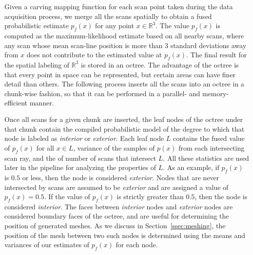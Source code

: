 \documentclass[12pt,onecolumn,oneside]{book}
\begin{document}
Given a carving mapping function for each scan point taken during the data acquisition process, we merge all the scans spatially to obtain a fused probabilistic estimate $p_f(x)$ for any point $x \in \mathbb{R}^3$.  The value $p_f(x)$ is computed as the maximum-likelihood estimate based on all nearby scans, where any scan whose mean scan-line position is more than $3$ standard deviations away from $x$ does not contribute to the estimated value at $p_f(x)$.  The final result for the spatial labeling of $\mathbb{R}^3$ is stored in an octree.  The advantage of the octree is that every point in space can be represented, but certain areas can have finer detail than others.  The following process inserts all the scans into an octree in a chunk-wise fashion, so that it can be performed in a parallel- and memory-efficient manner.


Once all scans for a given chunk are inserted, the leaf nodes of the octree under that chunk contain the compiled probabilistic model of the degree to which that node is labeled as {\it interior} or {\it exterior}.  Each leaf node $L$ contains the fused value of $p_f(x)$ for all $x \in L$, variance of the samples of $p(x)$ from each intersecting scan ray, and the of number of scans that intersect $L$.  All these statistics are used later in the pipeline for analyzing the properties of $L$.  As an example, if $p_f(x)$ is $0.5$ or less, then the node is considered {\it exterior}.  Nodes that are never intersected by scans are assumed to be {\it exterior} and are assigned a value of $p_f(x)=0.5$.  If the value of $p_f(x)$ is strictly greater than $0.5$, then the node is considered {\it interior}.  The faces between {\it interior} nodes and {\it exterior} nodes are considered boundary faces of the octree, and are useful for determining the position of generated meshes.  As we discuss in Section~\ref{ssec:meshing}, the position of the mesh between two such nodes is determined using the means and variances of our estimates of $p_f(x)$ for each node.
\end{document}

